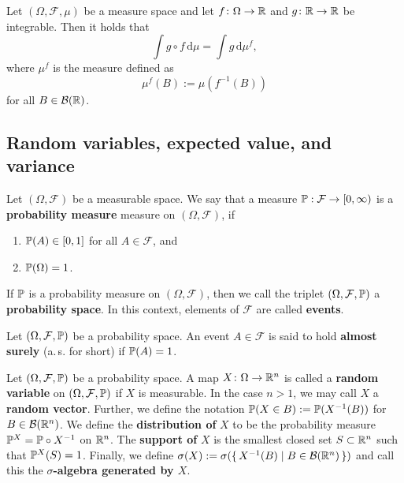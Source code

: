 \begin{proposition}
    \label{prop:integral-transform}
    Let $(\Omega, \mathcal{F}, \mu)$ be a measure space and let $f\colon \Omega \to \mathbb{R}$ and
    $g\colon \mathbb{R} \to \mathbb{R}$ be integrable. Then it holds that
    \[
        \int g \circ f \, \text{d}\mu = \int g \, \text{d}\mu^{f},
    \]
    where $\mu^f$ is the measure defined as
    \[
        \mu^{f}(B) := \mu(f^{-1}(B))
    \]
    for all $B\in \mathcal{B}(\mathbb{R})$.
\end{proposition}

\subsection{Random variables, expected value, and variance}

\begin{definition}
    Let $(\Omega, \mathcal{F})$ be a measurable space. We say that a measure
    $\mathbb{P}: \mathcal{F} \to [0, \infty)$ is a \textbf{probability measure} measure on
    $(\Omega, \mathcal{F})$, if
    \begin{enumerate}
        \item $\mathbb{P}(A) \in [0, 1]$ for all $A\in\mathcal{F}$, and
        \item $\mathbb{P}(\Omega) = 1$.
    \end{enumerate}
    If $\mathbb{P}$ is a probability measure on $(\Omega, \mathcal{F})$, then we
    call the triplet $(\Omega, \mathcal{F}, \mathbb{P})$ a \textbf{probability space}.
    In this context, elements of $\mathcal{F}$ are called \textbf{events}.
\end{definition}

\begin{definition}
    Let $(\Omega, \mathcal{F}, \mathbb{P})$ be a probability space. An event $A\in\mathcal{F}$ is said to hold \textbf{almost surely} (a.\,s. for short) if $\mathbb{P}(A) = 1$.
\end{definition}

\begin{definition}
    Let $(\Omega, \mathcal{F}, \mathbb{P})$ be a probability space. A map $X\colon \Omega \to \mathbb{R}^n$ is called
    a \textbf{random variable} on $(\Omega, \mathcal{F}, \mathbb{P})$ if $X$ is
    measurable.
    In the case $n > 1$, we may call $X$ a \textbf{random vector}.
    Further, we define the notation $\mathbb{P}(X \in B) := \mathbb{P}(X^{-1}(B))$ for
    $B\in \mathcal{B}(\mathbb{R}^n)$.
    We define the \textbf{distribution of} $X$ to be the probability measure
    $\mathbb{P}^X = \mathbb{P} \circ X^{-1}$ on $\mathbb{R}^n$.
    The \textbf{support of} $X$ is the smallest closed set $S\subset\mathbb{R}^n$ such that $\mathbb{P}^X(S) = 1$.
    Finally, we define
    $\sigma(X) := \sigma(\{\, X^{-1}(B) \mid B\in \mathcal{B}(\mathbb{R}^n) \,\})$
    and call this the \textbf{$\sigma$-algebra generated by $X$}.
\end{definition}

